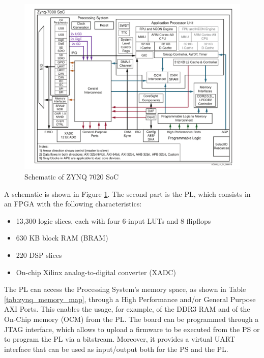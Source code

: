 \begin{figure}[H]
\centering
\includegraphics[width=1.0\linewidth]{images/chapter3/zynq.pdf}
\caption{Schematic of ZYNQ 7020 SoC}
\label{fig:zynq7020}
\end{figure}

A schematic is shown in Figure \ref{fig:zynq7020}. The second part is the PL, which consists in an FPGA with the following characteristics:

\begin{itemize}
    \item 13,300 logic slices, each with four 6-input LUTs and 8 flipflops
    \item 630 KB block RAM (BRAM)
    \item 220 DSP slices
    \item On-chip Xilinx analog-to-digital converter (XADC)
\end{itemize}

The PL can access the Processing System's memory space, as shown in Table \ref{tab:zynq_memory_map}, through a High Performance and/or General Purpose AXI Ports. This enables the usage, for example, of the DDR3 RAM and of the On-Chip memory (OCM) from the PL. The board can be programmed through a JTAG interface, which allows to upload a firmware to be executed from the PS or to program the PL via a bitstream. Moreover, it provides a virtual UART interface that can be used as input/output both for the PS and the PL.\bigskip

